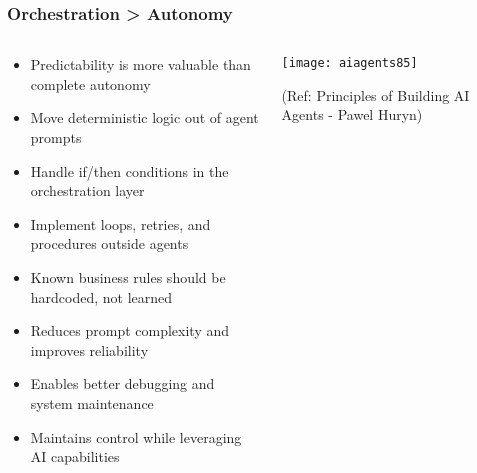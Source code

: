 \begin{frame}[fragile]\frametitle{Orchestration > Autonomy}
\begin{columns}
    \begin{column}[T]{0.6\linewidth}
      \begin{itemize}
		\item Predictability is more valuable than complete autonomy
		\item Move deterministic logic out of agent prompts
		\item Handle if/then conditions in the orchestration layer
		\item Implement loops, retries, and procedures outside agents
		\item Known business rules should be hardcoded, not learned
		\item Reduces prompt complexity and improves reliability
		\item Enables better debugging and system maintenance
		\item Maintains control while leveraging AI capabilities
	  \end{itemize}
    \end{column}
    \begin{column}[T]{0.4\linewidth}
		\begin{center}
		\texttt{[image: aiagents85]}
		
		{\tiny (Ref: Principles of Building AI Agents - Pawel Huryn)}
		\end{center}	
    \end{column}
  \end{columns}
\end{frame}

